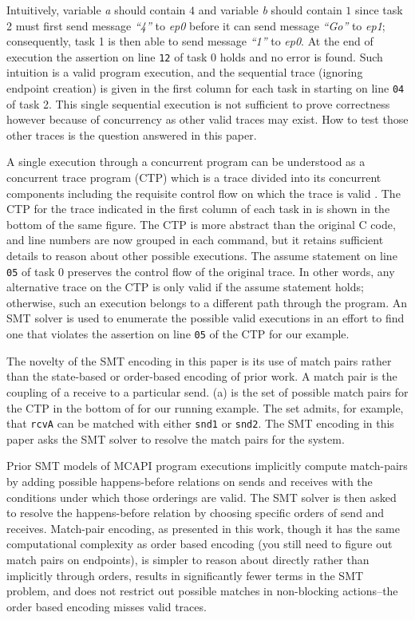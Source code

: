 Intuitively, variable \textit{a} should contain $4$ and variable
\textit{b} should contain $1$ since task 2 must first send message \textit{``4''}
to \textit{ep0} before it can send message \textit{``Go''} to \textit{ep1};
consequently, task 1 is then able to send message \textit{``1''} to
\textit{ep0}. At the end of execution the assertion on line \texttt{12}
of task 0 holds and no error is found. Such intuition is a valid
program execution, and the sequential trace (ignoring endpoint creation)
is given in the first column for each
task in  starting on line \texttt{04} of task 2. This single sequential execution is not sufficient to prove correctness
however because of concurrency as other valid traces may exist. How
to test those other traces is the question answered in this paper.

A single execution through a concurrent program can be understood as a
concurrent trace program (CTP) which is a trace divided into its
concurrent components including the requisite control flow on which
the trace is valid \cite{wang:fse09}. The CTP for the trace indicated
in the first column of each task in  is shown in
the bottom of the same figure. The CTP is more abstract than the
original C code, and line numbers are now grouped in each command, but it retains sufficient details to reason about
other possible executions. The assume statement on line \texttt{05}
of task 0 preserves the control flow of the original trace. In other
words, any alternative trace on the CTP is only valid if the assume
statement holds; otherwise, such an execution belongs to a different
path through the program. An SMT solver is used to enumerate the
possible valid executions in an effort to find one that violates the
assertion on line \texttt{05} of the CTP for our example.

The novelty of the SMT encoding in this paper is its use of match
pairs rather than the state-based or order-based encoding of prior
work. A match pair is the coupling of a receive to a particular send.
(a) is the set of possible match pairs for the CTP in
the bottom of  for our running example. The set
admits, for example, that \texttt{rcvA} can be matched with either
\texttt{snd1} or \texttt{snd2}. The SMT encoding in this paper asks
the SMT solver to resolve the match pairs for the system. 

Prior SMT models of MCAPI program executions implicitly compute
match-pairs by adding possible happens-before relations on sends and
receives with the conditions under which those orderings are
valid. The SMT solver is then asked to resolve the happens-before
relation by choosing specific orders of send and receives. Match-pair
encoding, as presented in this work, though it has the same
computational complexity as order based encoding (you still need to
figure out match pairs on endpoints), is simpler to reason about
directly rather than implicitly through orders, results in
significantly fewer terms in the SMT problem, and does not restrict
out possible matches in non-blocking actions--the order based encoding
misses valid traces.

